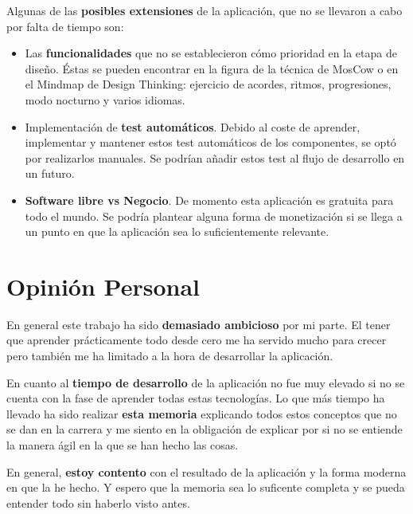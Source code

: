 \documentclass[12pt,twoside,titlepage]{report}
\newcommand\blankpage{%
    \newpage
    \null
    \thispagestyle{empty}%
    \newpage}
\begin{document}
{Algunas de las \textbf{posibles extensiones} de la aplicación, que no se llevaron a cabo por falta de tiempo son:

\begin{itemize}
    \item Las \textbf{funcionalidades} que no se establecieron cómo prioridad en la etapa de diseño. Éstas se pueden encontrar en la figura de la técnica de MosCow o en el Mindmap de Design Thinking: ejercicio de acordes, ritmos, progresiones, modo nocturno y varios idiomas.
    \item Implementación de \textbf{test automáticos}. Debido al coste de aprender, implementar y mantener estos test automáticos de los componentes, se optó por realizarlos manuales. Se podrían añadir estos test al flujo de desarrollo en un futuro.
    \item \textbf{Software libre vs Negocio}. De momento esta aplicación es gratuita para todo el mundo. Se podría plantear alguna forma de monetización si se llega a un punto en que la aplicación sea lo suficientemente relevante.
\end{itemize}

\section{Opinión Personal}
En general este trabajo ha sido \textbf{demasiado ambicioso} por mi parte. El tener que aprender prácticamente todo desde cero me ha servido mucho para crecer pero también me ha limitado a la hora de desarrollar la aplicación.

En cuanto al \textbf{tiempo de desarrollo} de la aplicación no fue muy elevado si no se cuenta con la fase de aprender todas estas tecnologías. Lo que más tiempo ha llevado ha sido realizar \textbf{esta memoria} explicando todos estos conceptos que no se dan en la carrera y me siento en la obligación de explicar por si no se entiende la manera ágil en la que se han hecho las cosas.

En general, \textbf{estoy contento} con el resultado de la aplicación y la forma moderna en que la he hecho. Y espero que la memoria sea lo suficente completa y se pueda entender todo sin haberlo visto antes.

\blankpage




{}
\footnotesize{
%


}
\raggedbottom
\afterpage{\blankpage}
\newpage


}
\end{document}
